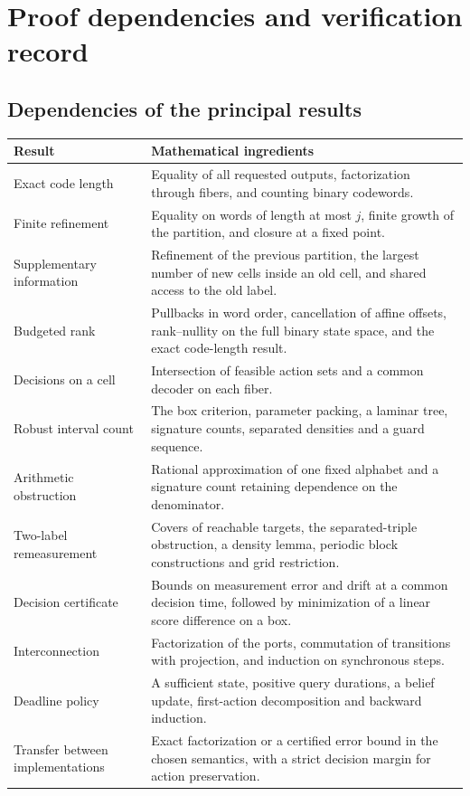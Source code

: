 \section{Proof dependencies and verification record}\label{app:verification}

\subsection{Dependencies of the principal results}
\begin{longtable}{p{}p{}}
\toprule Result & Mathematical ingredients\\\midrule\endhead
Exact code length & Equality of all requested outputs, factorization through fibers, and counting binary codewords.\\
Finite refinement & Equality on words of length at most $j$, finite growth of the partition, and closure at a fixed point.\\
Supplementary information & Refinement of the previous partition, the largest number of new cells inside an old cell, and shared access to the old label.\\
Budgeted rank & Pullbacks in word order, cancellation of affine offsets, rank--nullity on the full binary state space, and the exact code-length result.\\
Decisions on a cell & Intersection of feasible action sets and a common decoder on each fiber.\\
Robust interval count & The box criterion, parameter packing, a laminar tree, signature counts, separated densities and a guard sequence.\\
Arithmetic obstruction & Rational approximation of one fixed alphabet and a signature count retaining dependence on the denominator.\\
Two-label remeasurement & Covers of reachable targets, the separated-triple obstruction, a density lemma, periodic block constructions and grid restriction.\\
Decision certificate & Bounds on measurement error and drift at a common decision time, followed by minimization of a linear score difference on a box.\\
Interconnection & Factorization of the ports, commutation of transitions with projection, and induction on synchronous steps.\\
Deadline policy & A sufficient state, positive query durations, a belief update, first-action decomposition and backward induction.\\
Transfer between implementations & Exact factorization or a certified error bound in the chosen semantics, with a strict decision margin for action preservation.\\
\bottomrule
\end{longtable}

